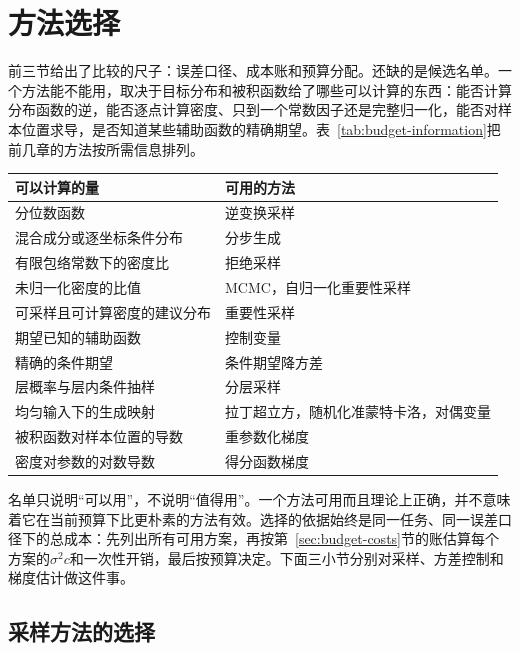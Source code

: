 \section{方法选择}
\label{sec:budget-selection}

前三节给出了比较的尺子：误差口径、成本账和预算分配。还缺的是候选名单。一个方法能不能用，取决于目标分布和被积函数给了哪些可以计算的东西：能否计算分布函数的逆，能否逐点计算密度、只到一个常数因子还是完整归一化，能否对样本位置求导，是否知道某些辅助函数的精确期望。表~\ref{tab:budget-information}把前几章的方法按所需信息排列。

\begin{BookInlineTable}
  \centering
  \caption{可计算的信息与相应的方法}
  \label{tab:budget-information}
  \begin{tabular}{@{}p{44mm}p{62mm}@{}}
    \toprule
    可以计算的量 & 可用的方法 \\
    \midrule
    分位数函数 & 逆变换采样 \\
    混合成分或逐坐标条件分布 & 分步生成 \\
    有限包络常数下的密度比 & 拒绝采样 \\
    未归一化密度的比值 & MCMC，自归一化重要性采样 \\
    可采样且可计算密度的建议分布 & 重要性采样 \\
    期望已知的辅助函数 & 控制变量 \\
    精确的条件期望 & 条件期望降方差 \\
    层概率与层内条件抽样 & 分层采样 \\
    均匀输入下的生成映射 & 拉丁超立方，随机化准蒙特卡洛，对偶变量 \\
    被积函数对样本位置的导数 & 重参数化梯度 \\
    密度对参数的对数导数 & 得分函数梯度 \\
    \bottomrule
  \end{tabular}
\end{BookInlineTable}

名单只说明“可以用”，不说明“值得用”。一个方法可用而且理论上正确，并不意味着它在当前预算下比更朴素的方法有效。选择的依据始终是同一任务、同一误差口径下的总成本：先列出所有可用方案，再按第~\ref{sec:budget-costs}节的账估算每个方案的$\sigma^{2}c$和一次性开销，最后按预算决定。下面三小节分别对采样、方差控制和梯度估计做这件事。

\subsection{采样方法的选择}
\label{sec:budget-sampler-choice}

